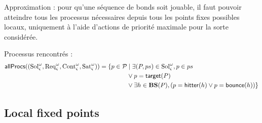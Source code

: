 


Approximation : pour qu'une séquence de bonds soit jouable, il faut pouvoir atteindre tous les processus nécessaires depuis tous les points fixes possibles locaux, uniquement à l'aide d'actions de priorité maximale pour la sorte considérée.





Processus rencontrés :
\begin{align*}
\mathsf{allProcs}((\mathrm{Sol}_\varsigma^\omega,\mathrm{Req}_\varsigma^\omega,\mathrm{Cont}_\varsigma^\omega,\mathrm{Sat}_\varsigma^\omega)) = \{ p \in \mathcal{P} &\mid \exists (P,ps) \in \mathrm{Sol}_\varsigma^\omega, p \in ps
\\ & \vee p = \mathsf{target}(P)
\\ & \vee \exists h \in \mathbf{BS}(P), (p = \mathsf{hitter}(h) \vee p = \mathsf{bounce}(h)) \}
\end{align*}

\subsection{Local fixed points}



